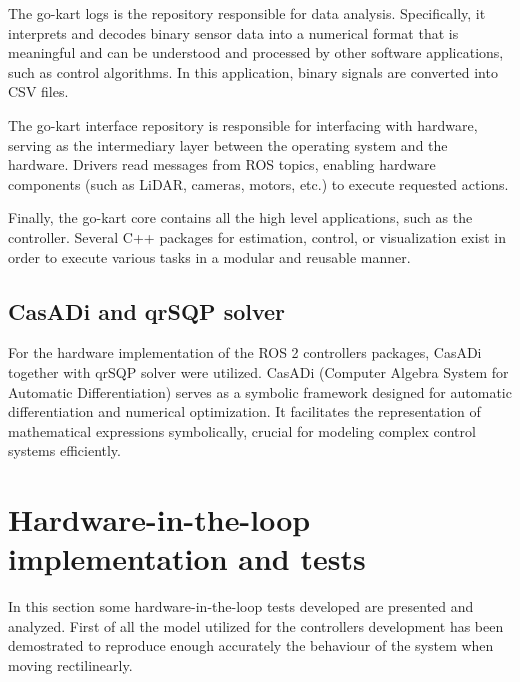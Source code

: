 \documentclass[a4paper,12pt,oneside]{book}
\begin{document}
The go-kart logs is the repository responsible for data analysis. 
Specifically, it interprets and decodes binary sensor data into a numerical format that is meaningful and can be understood and processed by other software applications, such as control algorithms.
In this application, binary signals are converted into CSV files.

The go-kart interface repository is responsible for interfacing with hardware, serving as the intermediary layer between the operating system and the hardware. 
Drivers read messages from ROS topics, enabling hardware components (such as LiDAR, cameras, motors, etc.) to execute requested actions.

Finally, the go-kart core contains all the high level applications, such as the controller. 
Several C++ packages for estimation, control, or visualization exist in order to execute various tasks in a modular and reusable manner.

\subsection*{CasADi and qrSQP solver}
For the hardware implementation of the ROS 2 controllers packages, CasADi together with qrSQP solver were utilized.
CasADi (Computer Algebra System for Automatic Differentiation) \cite{Andersson2018} serves as a symbolic framework designed for automatic differentiation and numerical optimization.
It facilitates the representation of mathematical expressions symbolically, crucial for modeling complex control systems efficiently.


\section{Hardware-in-the-loop implementation and tests}
In this section some hardware-in-the-loop tests developed are presented and analyzed.
First of all the model utilized for the controllers development has been demostrated to reproduce enough accurately the behaviour of the system when moving rectilinearly.
\end{document}
